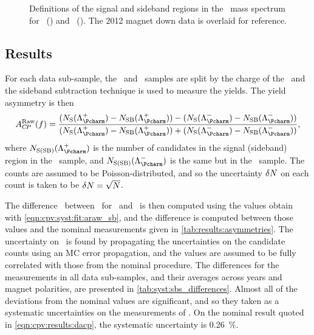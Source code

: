 \begin{figure}
\begin{subfigure}[b]{0.5\textwidth}
    \caption{\ppipi}
    \label{fig:cpv:syst:mass_windows:ppipi}
  \end{subfigure}
  \caption{%
    Definitions of the signal and sideband regions in the \PLambdac\ mass 
    spectrum for \pKK~() and 
    \ppipi~().
    The 2012 magnet down data is overlaid for reference.
  }
  \label{fig:cpv:syst:mass_windows}
\end{figure}

\subsection{Results}
\label{chap:cpv:syst:fit:results}

For each data sub-sample, the \pKK\ and \ppipi\ samples are split by the charge 
of the \PLambdac\ and the sideband subtraction technique is used to measure the 
yields.
The yield asymmetry is then
\begin{equation}
  \ARaw(f) = \frac{%
    (N_{\text{S}}(\PLambdac) - N_{\text{SB}}(\PLambdac)) -
    (N_{\text{S}}(\APLambdac) - N_{\text{SB}}(\APLambdac))
  }{%
    (N_{\text{S}}(\PLambdac) - N_{\text{SB}}(\PLambdac)) +
    (N_{\text{S}}(\APLambdac) - N_{\text{SB}}(\APLambdac))
  },
  \label{eqn:cpv:syst:fit:araw_sb}
\end{equation}
where $N_{\text{S(SB)}}(\PLambdac)$ is the number of candidates in the signal 
(sideband) region in the \PLambdac\ sample, and $N_{\text{S(SB)}}(\APLambdac)$ 
is the same but in the \APLambdac\ sample.
The counts are assumed to be Poisson-distributed, and so the uncertainty 
$\delta{N}$ on each count is taken to be $\delta{N} = \sqrt{N}$.

The difference \dACP\ between \ARaw\ for \pKK\ and \ppipi\ is then computed 
using the values obtain with \cref{eqn:cpv:syst:fit:araw_sb}, and the 
difference is computed between those values and the nominal measurements given 
in \cref{tab:results:asymmetries}.
The uncertainty on \ARaw\ is found by propagating the uncertainties on the 
candidate counts using an \ac{MC} error propagation, and the values are assumed 
to be fully correlated with those from the nominal procedure.
The differences for the measurements in all data sub-samples, and their 
averages across years and magnet polarities, are presented in 
\cref{tab:syst:sbs_differences}.
Almost all of the deviations from the nominal values are significant, and so 
they taken as a systematic uncertainties on the measurements of \dACP\@.
On the nominal result quoted in \cref{eqn:cpv:results:dacp}, the systematic 
uncertainty is \SI{0.26}{\percent}.

